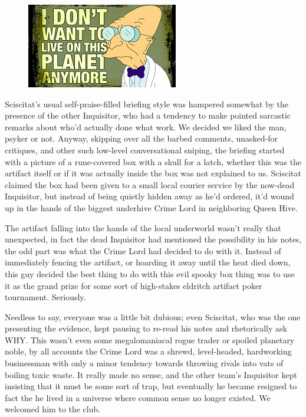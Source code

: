 \begin{figure}
	\begin{center}
		\includegraphics[width=\figwidth]{pics/18/46.png}
	\end{center}
\end{figure}
Sciscitat's usual self-praise-filled briefing style was hampered somewhat by the presence of the other Inquisitor, who had a tendency to make pointed sarcastic remarks about who'd actually done what work. 
We decided we liked the man, psyker or not. 
Anyway, skipping over all the barbed comments, unasked-for critiques, and other such low-level conversational sniping, the briefing started with a picture of a rune-covered box with a skull for a latch, whether this was the artifact itself or if it was actually inside the box was not explained to us. 
Sciscitat claimed the box had been given to a small local courier service by the now-dead Inquisitor, but instead of being quietly hidden away as he'd ordered, it'd wound up in the hands of the biggest underhive Crime Lord in neighboring Queen Hive. 


The artifact falling into the hands of the local underworld wasn't really that unexpected, in fact the dead Inquisitor had mentioned the possibility in his notes, the odd part was what the Crime Lord had decided to do with it. 
Instead of immediately fencing the artifact, or hoarding it away until the heat died down, this guy decided the best thing to do with this evil spooky box thing was to use it as the grand prize for some sort of high-stakes eldritch artifact poker tournament. 
Seriously. 


Needless to say, everyone was a little bit dubious; 
even Sciscitat, who was the one presenting the evidence, kept pausing to re-read his notes and rhetorically ask WHY. 
This wasn't even some megalomaniacal rogue trader or spoiled planetary noble, by all accounts the Crime Lord was a shrewd, level-headed, hardworking businessman with only a minor tendency towards throwing rivals into vats of boiling toxic waste. 
It really made no sense, and the other team's Inquisitor kept insisting that it must be some sort of trap, but eventually he became resigned to fact the he lived in a universe where common sense no longer existed. 
We welcomed him to the club. 


